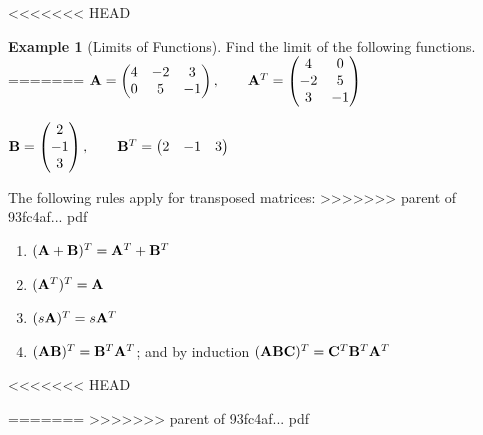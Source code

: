 \documentclass[]{book}
\theoremstyle{definition}
\theoremstyle{definition}
\newtheorem{example}{Example}[chapter]
\theoremstyle{definition}
\theoremstyle{remark}
\begin{document}
<<<<<<< HEAD
\begin{example}[Limits of Functions]
\protect\hypertarget{exm:limfun1}{}{\label{exm:limfun1} {} }Find the limit of the following functions.
=======
\({\bf A}=\begin{pmatrix} 4&-2&3\\0&5&-1\end{pmatrix}, \qquad {\bf A}^T=\begin{pmatrix} 4&0\\-2&5\\3&-1 \end{pmatrix}\)

\({\bf B}=\begin{pmatrix} 2\\-1\\3 \end{pmatrix}, \qquad {\bf B}^T=\begin{pmatrix} 2&-1&3\end{pmatrix}\)

The following rules apply for transposed matrices:
>>>>>>> parent of 93fc4af... pdf

\begin{enumerate}
        \item $({\bf A+B})^T = {\bf A}^T+{\bf B}^T$
        \item $({\bf A}^T)^T={\bf A}$
        \item $(s{\bf A})^T = s{\bf A}^T$
        \item $({\bf AB})^T = {\bf B}^T{\bf A}^T$; and by induction $({\bf ABC})^T = {\bf C}^T{\bf B}^T{\bf A}^T$
\end{enumerate}
<<<<<<< HEAD
\end{example}
=======
>>>>>>> parent of 93fc4af... pdf
\end{document}
